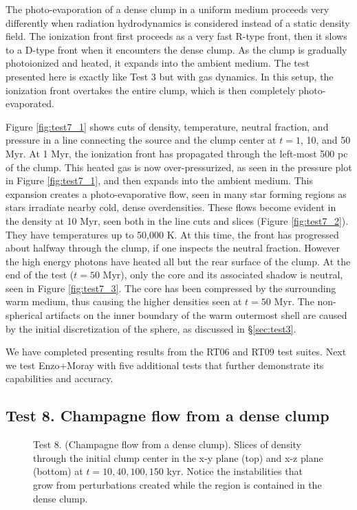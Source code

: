 \documentclass[useAMS,usenatbib]{mn2e}
\begin{document}
The photo-evaporation of a dense clump in a uniform medium proceeds
very differently when radiation hydrodynamics is considered instead of
a static density field.  The ionization front first proceeds as a very
fast R-type front, then it slows to a D-type front when it encounters
the dense clump.  As the clump is gradually photoionized and heated,
it expands into the ambient medium.  The test presented here is
exactly like Test 3 but with gas dynamics.  In this setup, the
ionization front overtakes the entire clump, which is then completely
photo-evaporated.

Figure \ref{fig:test7_1} shows cuts of density, temperature, neutral
fraction, and pressure in a line connecting the source and the clump
center at $t = 1$, 10, and 50 Myr.  At 1 Myr, the ionization front has
propagated through the left-most 500 pc of the clump.  This heated gas
is now over-pressurized, as seen in the pressure plot in Figure
\ref{fig:test7_1}, and then expands into the ambient medium.  This
expansion creates a photo-evaporative flow, seen in many star forming
regions \citep[e.g. M16;][]{Hester96} as stars irradiate nearby cold,
dense overdensities.  These flows become evident in the density at 10
Myr, seen both in the line cuts and slices (Figure \ref{fig:test7_2}).
They have temperatures up to 50,000 K.  At this time, the front has
progressed about halfway through the clump, if one inspects the
neutral fraction.  However the high energy photons have heated all but
the rear surface of the clump.  At the end of the test ($t = 50$ Myr),
only the core and its associated shadow is neutral, seen in Figure
\ref{fig:test7_3}.  The core has been compressed by the surrounding
warm medium, thus causing the higher densities seen at $t = 50$ Myr.
The non-spherical artifacts on the inner boundary of the warm
outermost shell are caused by the initial discretization of the
sphere, as discussed in \S\ref{sec:test3}.

We have completed presenting results from the RT06 and RT09 test
suites.  Next we test Enzo+Moray with five additional tests that
further demonstrate its capabilities and accuracy.

\subsection{Test 8. Champagne flow from a dense clump}

\begin{figure*}
  \caption{\label{fig:test8_1} Test 8. (Champagne flow from a dense
    clump).  Slices of density through the initial clump center in the
    x-y plane (top) and x-z plane (bottom) at $t = 10, 40, 100, 150$
    kyr.  Notice the instabilities that grow from perturbations
    created while the \hii region is contained in the dense
    clump.}
\end{figure*}
\end{document}

